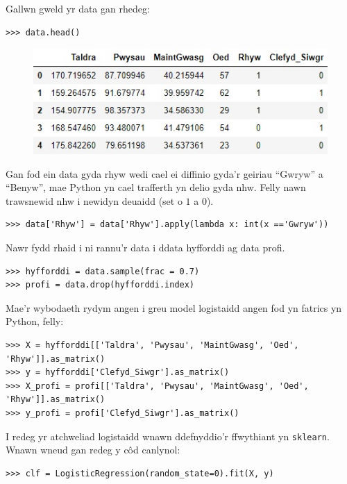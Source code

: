 Gallwn gweld yr data gan rhedeg:

\begin{verbatim}
>>> data.head()
\end{verbatim}

\begin{figure}[H]
\begin{center}
\includegraphics[width=0.5\linewidth]{../img/data_diabetes_python.jpg}
\end{center}
\end{figure}

Gan fod ein data gyda rhyw wedi cael ei diffinio gyda'r geiriau ``Gwryw'' a ``Benyw'', mae Python yn cael trafferth yn delio gyda nhw. Felly nawn trawsnewid nhw i newidyn deuaidd (set o $1$ a $0$).

\begin{verbatim}
>>> data['Rhyw'] = data['Rhyw'].apply(lambda x: int(x =='Gwryw'))
\end{verbatim}

Nawr fydd rhaid i ni rannu'r data i ddata hyfforddi ag data profi.

\begin{verbatim}
>>> hyfforddi = data.sample(frac = 0.7)
>>> profi = data.drop(hyfforddi.index)
\end{verbatim}

Mae'r wybodaeth rydym angen i greu model logistaidd angen fod yn fatrics yn Python, felly:

\begin{verbatim}
>>> X = hyfforddi[['Taldra', 'Pwysau', 'MaintGwasg', 'Oed', 'Rhyw']].as_matrix()
>>> y = hyfforddi['Clefyd_Siwgr'].as_matrix()
>>> X_profi = profi[['Taldra', 'Pwysau', 'MaintGwasg', 'Oed', 'Rhyw']].as_matrix()
>>> y_profi = profi['Clefyd_Siwgr'].as_matrix()
\end{verbatim}

I redeg yr atchweliad logistaidd wnawn ddefnyddio'r ffwythiant yn \texttt{sklearn}. Wnawn wneud gan redeg y c\^{o}d canlynol:

\begin{verbatim}
>>> clf = LogisticRegression(random_state=0).fit(X, y)
\end{verbatim}

